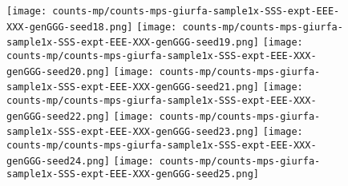 \documentclass[12pt]{article}
\begin{document}
\begin{figure}
  \texttt{[image: counts-mp/counts-mps-giurfa-sample1x-SSS-expt-EEE-XXX-genGGG-seed18.png]}\hspace{-7mm}
  \texttt{[image: counts-mp/counts-mps-giurfa-sample1x-SSS-expt-EEE-XXX-genGGG-seed19.png]}\hspace{-7mm}
  \texttt{[image: counts-mp/counts-mps-giurfa-sample1x-SSS-expt-EEE-XXX-genGGG-seed20.png]}
%
  \texttt{[image: counts-mp/counts-mps-giurfa-sample1x-SSS-expt-EEE-XXX-genGGG-seed21.png]}\hspace{-7mm}
  \texttt{[image: counts-mp/counts-mps-giurfa-sample1x-SSS-expt-EEE-XXX-genGGG-seed22.png]}\hspace{-7mm}
  \texttt{[image: counts-mp/counts-mps-giurfa-sample1x-SSS-expt-EEE-XXX-genGGG-seed23.png]}\hspace{-7mm}
  \texttt{[image: counts-mp/counts-mps-giurfa-sample1x-SSS-expt-EEE-XXX-genGGG-seed24.png]}\hspace{-7mm}
  \texttt{[image: counts-mp/counts-mps-giurfa-sample1x-SSS-expt-EEE-XXX-genGGG-seed25.png]}
%
\end{figure}
\end{document}
